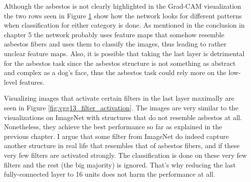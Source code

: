\begin{figure}[!h]
\label{fig:asbestos_gradcam}
\end{figure}

Although the asbestos is not clearly highlighted in the Grad-CAM visualization the two rows seen in Figure \ref{fig:asbestos_gradcam} show how the network looks for different patterns when classification for either category is done. As mentioned in the conclusion in chapter 5 the network probably uses feature maps that somehow resemble asbestos fibers and uses them to classify the images, thus leading to rather unclear feature maps. Also, it is possible that taking the last layer is detrimental for the asbestos task since the asbestos structure is not something as abstract and complex as a dog's face, thus the asbestos task could rely more on the low-level features. 

Visualizing images that activate certain filters in the last layer maximally are seen in Figure \ref{fig:vgg13_filter_activation}. The images are very similar to the visualizations on ImageNet with structures that do not resemble asbestos at all. Nonetheless, they achieve the best performance so far as explained in the previous chapter. I argue that some filter from ImageNet do indeed capture another structure in real life that resembles that of asbestos fibers, and if these very few filters are activated strongly. The classification is done on these very few filters and the rest (the big majority) is ignored. That's why reducing the last fully-connected layer to 16 units does not harm the performance at all.


